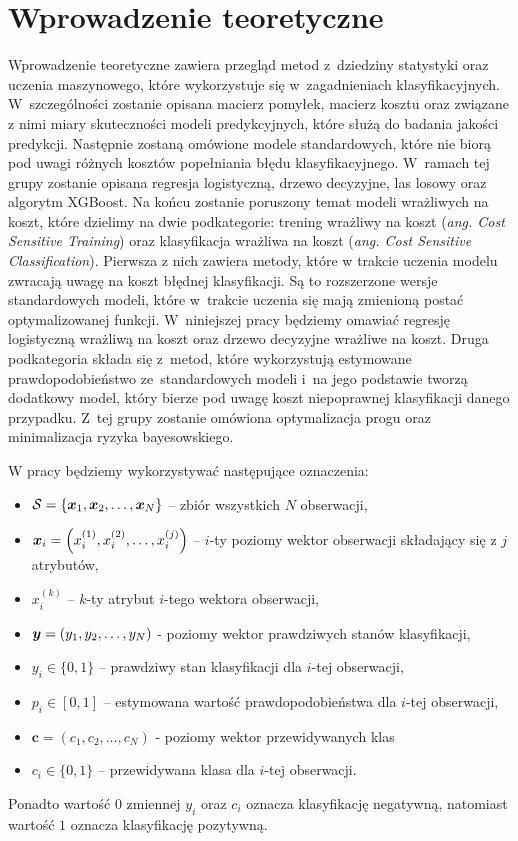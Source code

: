 \documentclass[inzynierska]{pwr_wmat_praca_dyplomowa}
\theoremstyle{plain}
\numberwithin{theorem}{chapter}
\theoremstyle{definition}
\numberwithin{theorem}{chapter}
\begin{document}
\chapter{Wprowadzenie teoretyczne}

Wprowadzenie teoretyczne zawiera przegląd metod z~dziedziny statystyki oraz uczenia maszynowego, które wykorzystuje się w~zagadnieniach klasyfikacyjnych. W~szczególności zostanie opisana macierz pomyłek, macierz kosztu oraz związane z nimi miary skuteczności modeli predykcyjnych, które służą do badania jakości predykcji. Następnie zostaną omówione modele standardowych, które nie biorą pod uwagi różnych kosztów popełniania błędu klasyfikacyjnego. W~ramach tej grupy zostanie opisana regresja logistyczną, drzewo decyzyjne, las losowy oraz algorytm XGBoost. Na końcu zostanie poruszony temat modeli wrażliwych na koszt, które dzielimy na dwie podkategorie: trening wrażliwy na koszt (\textit{ang. Cost Sensitive Training}) oraz klasyfikacja wrażliwa na koszt (\textit{ang. Cost Sensitive Classification})\cite{RMoser}. Pierwsza z nich zawiera metody, które w trakcie uczenia modelu zwracają uwagę na koszt błędnej klasyfikacji. Są to rozszerzone wersje standardowych modeli, które w~trakcie uczenia się mają zmienioną postać optymalizowanej funkcji. W~niniejszej pracy będziemy omawiać regresję logistyczną wrażliwą na koszt oraz drzewo decyzyjne wrażliwe na koszt. Druga podkategoria składa się z~metod, które wykorzystują estymowane prawdopodobieństwo ze~standardowych modeli i~na jego podstawie tworzą dodatkowy model, który bierze pod uwagę koszt niepoprawnej klasyfikacji danego przypadku. Z~tej grupy zostanie omówiona optymalizacja progu oraz minimalizacja ryzyka bayesowskiego.

W pracy będziemy wykorzystywać następujące oznaczenia:
\begin{itemize}
	\item $\mathcal{S} = \{\boldsymbol{x}_1, \boldsymbol{x}_2, \dots, \boldsymbol{x}_N \}$ -- zbiór wszystkich $N$ obserwacji,
	\item $\boldsymbol{x}_{i} = \left(x_i^{(1)}, x_i^{(2)}, \dots, x_i^{(j)} \right)$ -- $i$-ty poziomy wektor obserwacji składający się z $j$ atrybutów,
	\item $x_i^{(k)}$ -- $k$-ty atrybut $i$-tego wektora obserwacji,
	\item $\boldsymbol{y} = (y_1, y_2, \dots, y_N)$ - poziomy wektor prawdziwych stanów klasyfikacji,
	\item $y_i \in \{0,1\}$ -- prawdziwy stan klasyfikacji dla $i$-tej obserwacji,
	\item $p_i \in [0,1]$ -- estymowana wartość prawdopodobieństwa dla $i$-tej obserwacji,
	\item $\boldsymbol{c} = (c_1, c_2, \dots, c_N) $ - poziomy wektor przewidywanych klas
	\item $c_i \in \{0,1\} $ -- przewidywana klasa dla $i$-tej obserwacji.
\end{itemize}
Ponadto wartość $0$ zmiennej $y_i$ oraz $c_i$ oznacza klasyfikację negatywną, natomiast wartość $1$ oznacza klasyfikację pozytywną.
\end{document}
